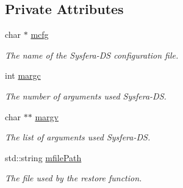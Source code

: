 \subsection*{Private Attributes}
\begin{DoxyCompactItemize}
\item 
\hypertarget{classUtilsProxy_a7ba14b7bc3d594279b050dfbadafe53e}{
char $\ast$ \hyperlink{classUtilsProxy_a7ba14b7bc3d594279b050dfbadafe53e}{mcfg}}
\label{classUtilsProxy_a7ba14b7bc3d594279b050dfbadafe53e}

\begin{DoxyCompactList}\small\item\em The name of the Sysfera-\/DS configuration file. \item\end{DoxyCompactList}\item 
\hypertarget{classUtilsProxy_addc7c06a5e2acd28d2c952e397e91788}{
int \hyperlink{classUtilsProxy_addc7c06a5e2acd28d2c952e397e91788}{margc}}
\label{classUtilsProxy_addc7c06a5e2acd28d2c952e397e91788}

\begin{DoxyCompactList}\small\item\em The number of arguments used Sysfera-\/DS. \item\end{DoxyCompactList}\item 
\hypertarget{classUtilsProxy_a5217a4157bd80b6c546bc198e7fc3f68}{
char $\ast$$\ast$ \hyperlink{classUtilsProxy_a5217a4157bd80b6c546bc198e7fc3f68}{margv}}
\label{classUtilsProxy_a5217a4157bd80b6c546bc198e7fc3f68}

\begin{DoxyCompactList}\small\item\em The list of arguments used Sysfera-\/DS. \item\end{DoxyCompactList}\item 
\hypertarget{classUtilsProxy_abe1479afd2eb2f89157c031b119a3105}{
std::string \hyperlink{classUtilsProxy_abe1479afd2eb2f89157c031b119a3105}{mfilePath}}
\label{classUtilsProxy_abe1479afd2eb2f89157c031b119a3105}

\begin{DoxyCompactList}\small\item\em The file used by the restore function. \item\end{DoxyCompactList}\end{DoxyCompactItemize}


